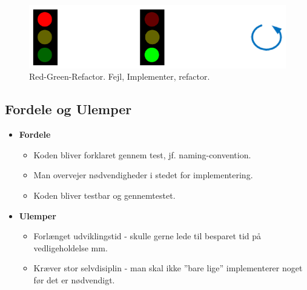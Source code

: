 \begin{figure}[H]
\centering
\includegraphics[width=0.7\linewidth]{figs/redgreen}
\caption{Red-Green-Refactor. Fejl, Implementer, refactor.}
\label{fig:redgreen}
\end{figure}

\subsection{Fordele og Ulemper}

\begin{itemize}
	
	\item \textbf{Fordele}	
	\begin{itemize}
		\item Koden bliver forklaret gennem test, jf. naming-convention.
		\item Man overvejer nødvendigheder i stedet for implementering.
		\item Koden bliver testbar og gennemtestet.
	\end{itemize}
	
	\item \textbf{Ulemper}	
	\begin{itemize}
		\item Forlænget udviklingstid - skulle gerne lede til besparet tid på vedligeholdelse mm.
		\item Kræver stor selvdisiplin - man skal ikke ''bare lige'' implementerer noget før det er nødvendigt.
	\end{itemize}
		
\end{itemize}
































